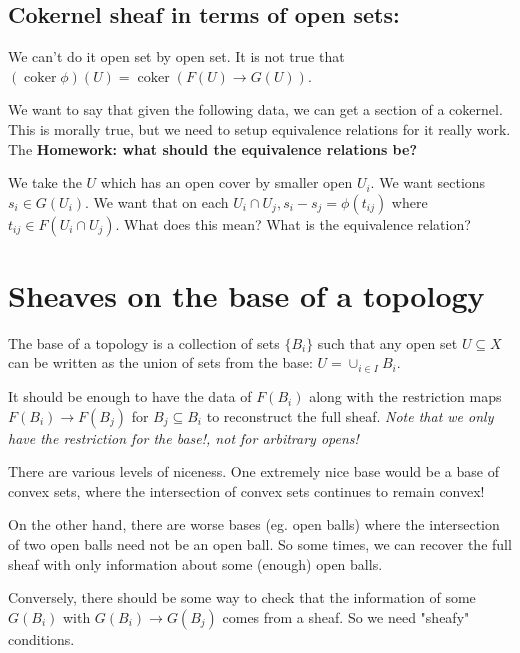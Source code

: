 \documentclass{book}
\newcommand{\coker}{\operatorname{coker}}
\theoremstyle{definition}
\begin{document}
\subsection{Cokernel sheaf in terms of open sets:}
We can't do it open set by open set. It is not true that $(\coker \phi)(U) = \coker (F(U) \rightarrow G(U))$.

We want to say that given the following data, we can get a section of a cokernel.
This is morally true, but we need to setup equivalence relations for it really work.
The \textbf{Homework: what should the equivalence relations be?}

We take the $U$ which has an open cover by smaller open $U_i$. We want sections
$s_i \in G(U_i)$. We want that on each $U_i \cap U_j, s_i - s_j = \phi(t_{ij})$
where $t_{ij} \in F(U_i \cap U_j)$. What does this mean? What is the equivalence
relation?

\section{Sheaves on the base of a topology}

The base of a topology is a collection of sets $\{ B_i \}$ such that any open set $U \subseteq X$
can be written as the union of sets from the base: $U = \cup_{i \in I} B_i$.

It should be enough to have the data of $F(B_i)$ along with the restriction
maps $F(B_i) \rightarrow F(B_j)$ for $B_j \subseteq B_i$ to reconstruct
the full sheaf. \emph{Note that we only have the restriction for the base!, not for arbitrary opens!}

There are various levels of niceness. One extremely nice base would be a base
of convex sets, where the intersection of convex sets continues to remain convex!

On the other hand, there are worse bases (eg. open balls) where the intersection
of two open balls need not be an open ball. So some times, we can recover
the full sheaf with only information about some (enough) open balls.

Conversely, there should be some way to check that the
information of some $G(B_i)$ with $G(B_i) \rightarrow G(B_j)$ comes from 
a sheaf. So we need "sheafy" conditions.
\end{document}
